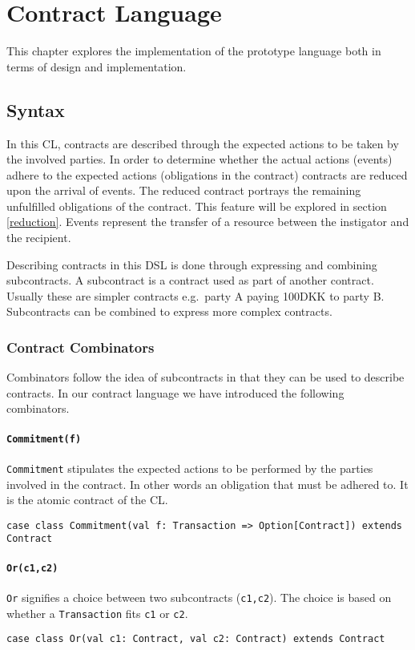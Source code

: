 \documentclass{ituthesis}
\begin{document}
\chapter{Contract Language}
This chapter explores the implementation of the prototype language both in terms of design and implementation.

\section{Syntax}\label{language}
In this CL, contracts are described through the expected actions to be taken by the involved parties. In order to determine whether the actual actions (events) adhere to the expected actions (obligations in the contract) contracts are reduced upon the arrival of events. The reduced contract portrays the remaining unfulfilled obligations of the contract. This feature will be explored in section \ref{reduction}. Events represent the transfer of a resource between the instigator and the recipient.

Describing contracts in this DSL is done through expressing and combining subcontracts. A subcontract is a contract used as part of another contract. Usually these are simpler contracts e.g.\ party A paying 100DKK to party B. Subcontracts can be combined to express more complex contracts.
\subsection{Contract Combinators}
\label{combinators}
Combinators follow the idea of subcontracts in that they can be used to describe contracts. In our contract language we have introduced the following combinators.

\subsubsection{\texttt{\textbf{Commitment(f)}}}
\texttt{Commitment} stipulates the expected actions to be performed by the parties involved in the contract. In other words an obligation that must be adhered to. It is the atomic contract of the CL. 
\begin{lstlisting}
case class Commitment(val f: Transaction => Option[Contract]) extends Contract
\end{lstlisting}

\subsubsection{\texttt{\textbf{Or(c1,c2)}}}
\texttt{Or} signifies a choice between two subcontracts (\texttt{c1,c2}). The choice is based on whether a \texttt{Transaction} fits \texttt{c1} or \texttt{c2}.
\begin{lstlisting}
case class Or(val c1: Contract, val c2: Contract) extends Contract
\end{lstlisting}
\end{document}
